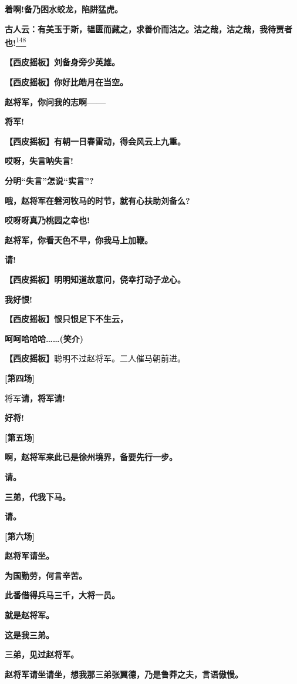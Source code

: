 \textbf{着啊!备乃困水蛟龙，陷阱猛虎。}

\textbf{古人云：有美玉于斯，韫匮而藏之，求善价而沽之。沽之哉，沽之哉，我待贾者也!}\protect\hyperlink{fn148}{\textsuperscript{148}}

\textbf{【西皮摇板】刘备身旁少英雄。}

\textbf{【西皮摇板】你好比皓月在当空。}

\textbf{赵将军，你问我的志啊------}

\textbf{将军!}

\textbf{【西皮摇板】有朝一日春雷动，得会风云上九重。}

\textbf{哎呀，失言呐失言!}

\textbf{分明``失言''怎说``实言''?}

\textbf{哦，赵将军在磐河牧马的时节，就有心扶助刘备么?}

\textbf{哎呀呀真乃桃园之幸也!}

\textbf{赵将军，你看天色不早，你我马上加鞭。}

\textbf{请!}

\textbf{【西皮摇板】明明知道故意问，侥幸打动子龙心。}

\textbf{我好恨!}

\textbf{【西皮摇板】恨只恨足下不生云，}

\textbf{呵呵哈哈哈\ldots{}\ldots{}(笑介)}

\textbf{【西皮摇板】}聪明不过赵将军。二人催马朝前进。

\textbf{{[}第四场{]}}

将军\textbf{请，将军请!}

\textbf{好将!}

\textbf{{[}第五场{]}}

\textbf{啊，赵将军来此已是徐州境界，备要先行一步。}

\textbf{请。}

\textbf{三弟，代我下马。}

\textbf{请。}

\textbf{{[}第六场{]}}

\textbf{赵将军请坐。}

\textbf{为国勤劳，何言辛苦。}

\textbf{此番借得兵马三千，大将一员。}

\textbf{就是赵将军。}

\textbf{这是我三弟。}

\textbf{三弟，见过赵将军。}

\textbf{赵将军请坐请坐，想我那三弟张翼德，乃是鲁莽之夫，言语傲慢。}

